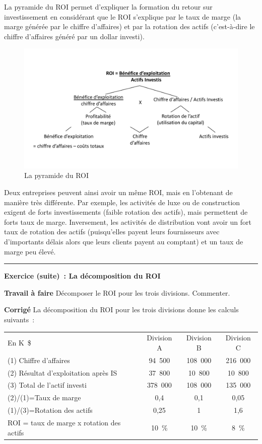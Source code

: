 \documentclass[oneside]{kaobook}
\begin{document}
La pyramide du ROI permet d'expliquer la formation du retour sur investissement en considérant que le ROI s'explique par le taux de marge (la marge générée par le chiffre d'affaires) et par la rotation des actifs (c'est-à-dire le chiffre d'affaires généré par un dollar investi).

\begin{figure}[H]

\includegraphics{./img/roi.pdf}
\caption{La pyramide du ROI}
\end{figure}

Deux entreprises peuvent ainsi avoir un même ROI, mais en l'obtenant de manière très différente. Par exemple, les activités de luxe ou de construction exigent de forts investissements (faible rotation des actifs), mais permettent de forts taux de marge. Inversement, les activités de distribution vont avoir un fort taux de rotation des actifs (puisqu'elles payent leurs fournisseurs avec d'importants délais alors que leurs clients payent au comptant) et un taux de marge peu élevé.

\noindent\rule{\textwidth}{0.5pt}
\textbf{Exercice (suite) : La décomposition du ROI}

\textbf{Travail à faire}
Décomposer le ROI pour les trois divisions. Commenter.

\textbf{Corrigé}
La décomposition du ROI pour les trois divisions donne les calculs suivants :
\begin{center}
\sidenotesize
\begin{tabular}{l c c c}
En K \$ & Division A & Division B & Division C\\
(1) Chiffre d'affaires & 94 500 & 108 000 & 216 000\\
(2) Résultat d'exploitation après IS & 37 800 & 10 800 & 10 800\\
(3) Total de l'actif investi & 378 000 & 108 000 & 135 000\\
(2)/(1)=Taux de marge & 0,4 & 0,1 & 0,05\\
(1)/(3)=Rotation des actifs & 0,25 & 1 & 1,6\\
ROI = taux de marge x rotation des actifs & 10 \% & 10 \% & 8 \%\\
\end{tabular}
\end{center}
\end{document}
